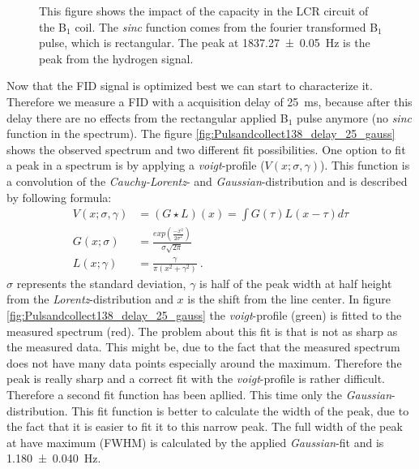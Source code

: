 \begin{figure}[H]
    \centering
    
    \caption[This figure shows the impact of the capacity in the LCR circuit of the B$_1$ coil.]{This figure shows the impact of the capacity in the LCR circuit of the B$_1$ coil. The \textit{sinc} function comes from the fourier transformed B$_1$ pulse, which is rectangular. The peak at \SI{1837.27 \pm 0.05}{\hertz} is the peak from the hydrogen signal.}
    \label{fig:Pulsandcollect}
\end{figure}
Now that the FID signal is optimized best we can start to characterize it. Therefore we measure a FID with a acquisition delay of \SI{25}{\milli \second}, because after this delay there are no effects from the rectangular applied B$_1$ pulse anymore (no \textit{sinc} function in the spectrum). The figure \ref{fig:Pulsandcollect138_delay_25_gauss} shows the observed spectrum and two different fit possibilities.\newline
One option to fit a peak in a spectrum is by applying a \textit{voigt}-profile ($V(x;\sigma , \gamma)$). This function is a convolution of the \textit{Cauchy-Lorentz}- and \textit{Gaussian}-distribution and is described by following formula:
\begin{align}
    V(x;\sigma , \gamma) &= ( G \star L)(x) = \int G(\tau) L(x-\tau) d\tau \\
    G(x;\sigma) &= \frac{exp\left(\frac{-x^2}{2\sigma^2}\right)}{\sigma \sqrt{2 \pi}} \\
    L(x;\gamma)  &= \frac{\gamma}{\pi \left( x^2+\gamma^2\right)} \ .
    \label{eq: voigt} 
\end{align}
$\sigma$ represents the standard deviation, $\gamma$ is half of the peak width at half height from the \textit{Lorentz}-distribution and $x$ is the shift from the line center. In figure \ref{fig:Pulsandcollect138_delay_25_gauss} the \textit{voigt}-profile (green) is fitted to the measured spectrum (red). The problem about this fit is that is not as sharp as the measured data. This might be, due to the fact that the measured spectrum does not have many data points especially around the maximum. Therefore the peak is really sharp and a correct fit with the \textit{voigt}-profile is rather difficult. Therefore a second fit function has been apllied. This time only the \textit{Gaussian}-distribution. This fit function is better to calculate the width of the peak, due to the fact that it is easier to fit it to this narrow peak. The full width of the peak at have maximum (FWHM) is calculated by the applied \textit{Gaussian}-fit and is \SI{1.180 \pm 0.040}{\hertz}. \newline
